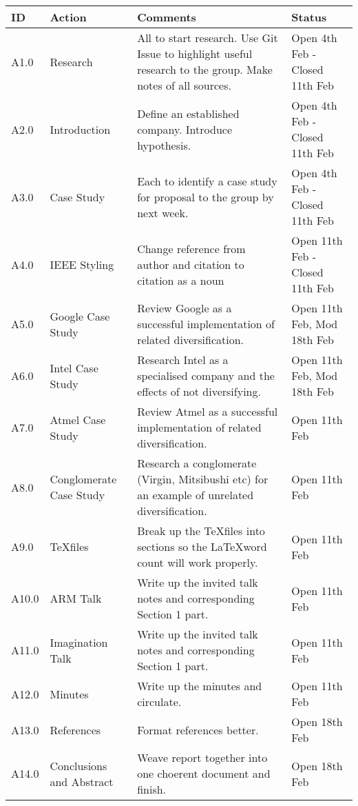 \begin{center}
\begin{longtable}{| p{} | >{\raggedright\arraybackslash}p{} |  p{} | >{\raggedright\arraybackslash}p{}|} \hline
\textbf{ID} & \textbf{Action} & \textbf{Comments} & \textbf{Status} \\ \hline
\endhead
A1.0	&	Research	&	All to start research. Use Git Issue to highlight useful research to the group. Make notes of all sources.	& Open 4th Feb - Closed 11th Feb \\ \hline
A2.0	&	Introduction	&	Define an established company. Introduce hypothesis.	&	Open 4th Feb - Closed 11th Feb \\ \hline
A3.0	&	Case Study	&	Each to identify a case study for proposal to the group by next week.	&	Open 4th Feb - Closed 11th Feb	\\ \hline
A4.0   &	IEEE Styling	&	Change reference from author and citation to citation as a noun		&	Open 11th Feb - Closed 11th Feb	\\ \hline
A5.0	&	Google Case Study	&	Review Google as a successful implementation of related diversification.	&	Open 11th Feb, Mod 18th Feb	\\ \hline 
A6.0	&	Intel Case Study	&	Research Intel as a specialised company and the effects of not diversifying.   &	Open 11th Feb, Mod 18th Feb	\\ \hline
A7.0	&	Atmel Case Study	&	Review Atmel as a successful implementation of related diversification.		&	Open 11th Feb	\\ \hline
A8.0	& 	Conglomerate Case Study	&	Research a conglomerate (Virgin, Mitsibushi etc) for an example of unrelated diversification. 	&	Open 11th Feb	\\ \hline
A9.0	&	\TeX files	&	Break up the \TeX files into sections so the \LaTeX word count will work properly. 	&	Open 11th Feb	\\ \hline
A10.0	&	ARM Talk	&	Write up the invited talk notes and corresponding Section 1 part.	&	Open 11th Feb	\\ \hline
A11.0	&	Imagination Talk 	&	Write up the invited talk notes and corresponding Section 1 part.	&	Open 11th Feb	\\ \hline
A12.0	&	Minutes	&	Write up the minutes and circulate. & Open 11th Feb \\ \hline
A13.0&	References	&	Format references better.	& Open 18th Feb \\ \hline
A14.0&	Conclusions and Abstract	&	Weave report together into one choerent document and finish.	& Open 18th Feb \\ \hline
\end{longtable}
\end{center}





